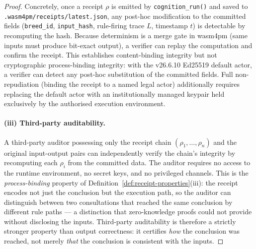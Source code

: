 \begin{proof}
Concretely, once a receipt $\rho$ is emitted by \texttt{cognition\_run()} and saved to
\texttt{.wasm4pm/receipts/latest.json}, any post-hoc modification to the committed fields
(\texttt{breed\_id}, \texttt{input\_hash}, rule-firing trace $L$, timestamp $t$) is
detectable by recomputing the hash.  Because determinism is a merge gate in wasm4pm
(same inputs must produce bit-exact output), a verifier can replay the computation and
confirm the receipt.  This establishes content-binding integrity but not cryptographic
process-binding integrity: with the v26.6.10 Ed25519 default actor, a verifier can detect
any post-hoc substitution of the committed fields.  Full non-repudiation (binding the
receipt to a named legal actor) additionally requires replacing the default actor with
an institutionally managed keypair held exclusively by the authorised execution environment.

\paragraph{(iii) Third-party auditability.}
A third-party auditor possessing only the receipt chain $(\rho_1, \ldots, \rho_n)$ and
the original input-output pairs can independently verify the chain's integrity by
recomputing each $\rho_i$ from the committed data.  The auditor requires no access to
the runtime environment, no secret keys, and no privileged channels.  This is the
\emph{process-binding} property of Definition~\ref{def:receipt-properties}(iii): the
receipt encodes not just the conclusion but the execution path, so the auditor can
distinguish between two consultations that reached the same conclusion by different rule
paths --- a distinction that zero-knowledge proofs could not provide without disclosing
the inputs.  Third-party auditability is therefore a strictly stronger property than
output correctness: it certifies \emph{how} the conclusion was reached, not merely
\emph{that} the conclusion is consistent with the inputs.


\end{proof}
